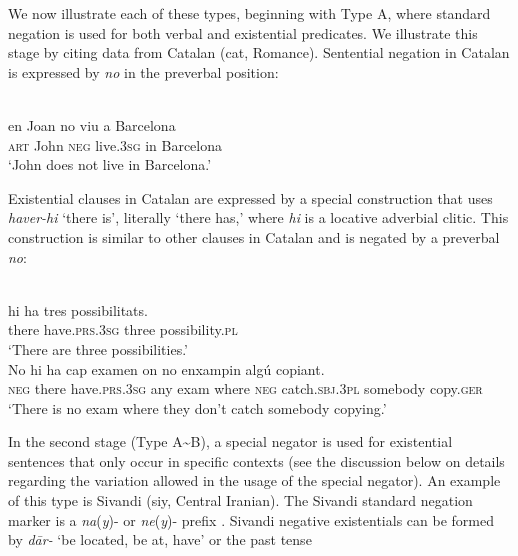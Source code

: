 ﻿\documentclass[output=paper]{langsci/langscibook}
\begin{document}
We now illustrate each of these types, beginning with Type A, where standard negation is used for both verbal and existential predicates. We illustrate this stage by citing data from Catalan (cat, Romance). Sentential negation in Catalan is expressed by \textit{no} in the preverbal position: 
%
\begin{exe}\ex\label{ex:ieur-catalan-Barcelona}
\\
    \gll en    Joan   no     viu          a   Barcelona \\
\textsc{art}  John    \textsc{neg}   live.\textsc{3sg}   in Barcelona \\
    \glt `John does not live in Barcelona.' %
    \end{exe}
%
Existential clauses in Catalan are expressed by a special construction that uses \textit{haver-hi} `there is', literally `there has,' where \textit{hi} is a locative adverbial clitic. This construction is similar to other clauses in Catalan and is negated by a preverbal \textit{no}: 
%
\begin{exe}\ex\label{ex:ieur-catalan-possibilities}
\\
    \gll hi      ha                  tres   possibilitats.  \\
there have.\textsc{prs}.\textsc{3sg} three possibility.\textsc{pl} \\
    \glt `There are three possibilities.' 
\ex\label{ex:ieur-catalan-copying}
\\
    \gll No hi ha cap examen on no enxampin algú copiant.  \\
\textsc{neg}   there have.\textsc{prs.3sg}   any exam 
where \textsc{neg}   catch.\textsc{sbj.3pl}   somebody  copy.\textsc{ger}\\
    \glt `There is no exam where they don't catch somebody copying.' 
    \end{exe}
%
In the second stage (Type A{\textasciitilde}B), a special negator is used
for existential sentences that only occur in specific contexts (see the
discussion below on details regarding the variation allowed in the usage of
the special negator). An example of this type is Sivandi (siy, Central
Iranian). The Sivandi standard negation marker is a \textit{na}(\textit{y})- or
\textit{ne}(\textit{y})- prefix \citep[69]{Lecoq1979}. Sivandi negative existentials
can be formed by \textit{dār-} `be located, be at, have' or the past tense
\end{document}
